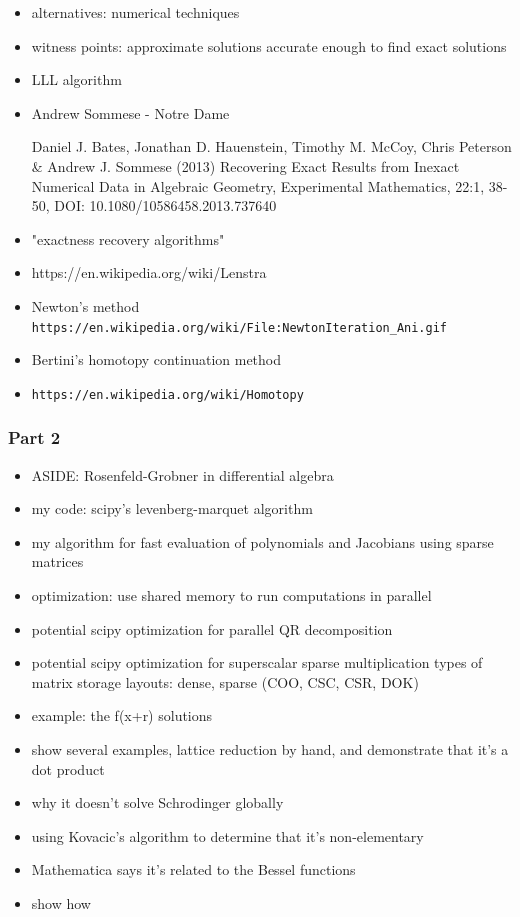 \documentclass{beamer}
\begin{document}
\begin{frame}
\begin{itemize}
\item alternatives: numerical techniques
\item witness points: approximate solutions accurate enough to find exact solutions
\item LLL algorithm

\item Andrew Sommese - Notre Dame

Daniel J. Bates, Jonathan D. Hauenstein, Timothy M. McCoy, Chris Peterson \& Andrew J. Sommese (2013)
Recovering Exact Results from Inexact Numerical Data in Algebraic Geometry,
Experimental Mathematics, 22:1, 38-50, DOI: 10.1080/10586458.2013.737640

\item "exactness recovery algorithms"
\item https://en.wikipedia.org/wiki/Lenstra%

\item Newton's method
     {\tt https://en.wikipedia.org/wiki/File:NewtonIteration\_Ani.gif}

\item Bertini's homotopy continuation method
\item {\tt https://en.wikipedia.org/wiki/Homotopy}
\end{itemize}
\end{frame}

\begin{frame}
\frametitle{Part 2}

\begin{itemize}
\item ASIDE: Rosenfeld-Grobner in differential algebra
\item my code: scipy's levenberg-marquet algorithm
\item my algorithm for fast evaluation of polynomials and Jacobians using sparse matrices
\item optimization: use shared memory to run computations in parallel
\item potential scipy optimization for parallel QR decomposition
\item potential scipy optimization for superscalar sparse multiplication
     types of matrix storage layouts: dense, sparse (COO, CSC, CSR, DOK)

\item example: the f(x+r) solutions
\item show several examples, lattice reduction by hand, and demonstrate that it's a dot product
\item why it doesn't solve Schrodinger globally
\item using Kovacic's algorithm to determine that it's non-elementary
\item Mathematica says it's related to the Bessel functions
\item show how
\end{itemize}
\end{frame}
\end{document}
